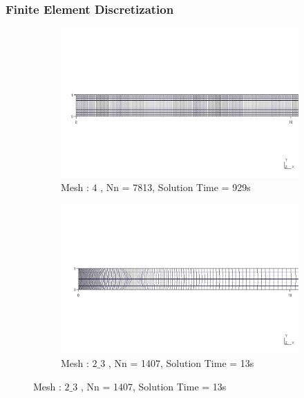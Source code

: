 \documentclass[9pt]{beamer}
\begin{document}
\begin{frame}
\frametitle{Finite Element Discretization }
\begin{figure}[h!]
\centering

\begin{subfigure}{1\textwidth}

\includegraphics[width=\linewidth,trim={0cm 9cm 0cm 9cm},clip]{ParaStudy_onlydata/Mesh_Dependency/meshes/4_zoomed.png}
\caption{Mesh : $4$ , Nn = 7813, Solution Time = 929s }

\end{subfigure} \vfill


\begin{subfigure}{1\textwidth}

\includegraphics[width=\linewidth,trim={0cm 9cm 0cm 9cm},clip]{ParaStudy_onlydata/Mesh_Dependency/meshes/2_3_zoomed.png}
\caption{Mesh : $2\_3$ , Nn = 1407, Solution Time = 13s }

\end{subfigure} \vfill


\end{figure}
\end{frame}
\end{document}
